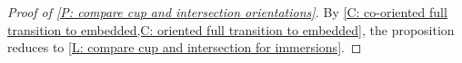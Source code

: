 \begin{proof}[Proof of \cref{P: compare cup and intersection orientations}]
By \cref{C: co-oriented full transition to embedded,C: oriented full transition to embedded}, the proposition reduces to \cref{L: compare cup and intersection for immersions}.
\end{proof}






\begin{comment}

OLD VERSION OF FIBER PRODUCTS FROM HERE THROUGH REST OF THE FILE

\subsubsection{Co-orientability of fiber products}

Before defining fiber product co-orientations, we first want to ensure that fiber products of co-orientable maps are themselves co-orientable. This will free us to then determine the specific co-orientations by working locally.

\begin{lemma}\label{L: co-orientable pullback}
Suppose $g:W\to M$ and  $f:V\to M$ are transverse. Then:

\begin{enumerate}
\item If $g$ is co-orienteable, the pullback $g^*:P\to V$ is  co-orientable.

\item If $g$ is proper, the pullback $g^*:P\to V$ is proper.
\end{enumerate}

\end{lemma}
Note that $f$ need not be co-orientable or proper for this lemma to apply.
\begin{proof}
We first show that the pullback is proper. Let us label our maps
\begin{diagram}
P&\rTo^{\pi_W} & W\\
\dTo^{g^*=\pi_V}&&\dTo_g\\
V&\rTo^f&M.
\end{diagram}


Suppose $K\subset V$ is compact. We have
\begin{align*}
\pi_V^{-1}(K)&=\{x\in P\mid \pi_V(x)\in K\}\\
&\subset \{x\in P\mid f\pi_V(x)\in f(K)\} \\
&=\{x\in P\mid g\pi_W(x)\in f(K)\} \\
&=\{x\in P\mid \pi_W(x)\in g^{-1}(f(K))\}.
\end{align*}
So $\pi_V^{-1}(K)\subset K\times g^{-1}(f(K))\subset V\times W$. But this is a product of compact sets as $g$ is proper. So $\pi_V$ is proper.


\end{comment}
